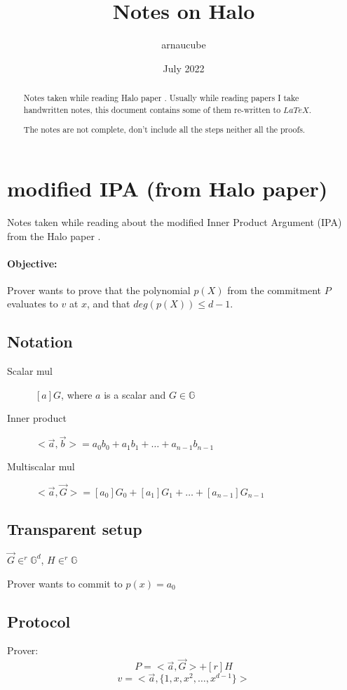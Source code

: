\documentclass{article}
\title{Notes on Halo}
\author{arnaucube}
\date{July 2022}
\theoremstyle{definition}
\begin{document}
\maketitle

\begin{abstract}
	Notes taken while reading Halo paper \cite{cryptoeprint:2019/1021}. Usually while reading papers I take handwritten notes, this document contains some of them re-written to $LaTeX$.

	The notes are not complete, don't include all the steps neither all the proofs.
\end{abstract}

\tableofcontents

\section{modified IPA (from Halo paper)}
Notes taken while reading about the modified Inner Product Argument (IPA) from the Halo paper \cite{cryptoeprint:2019/1021}.

\paragraph{Objective:}
Prover wants to prove that the polynomial $p(X)$ from the commitment $P$ evaluates to $v$ at $x$, and that $deg(p(X)) \leq d-1$.

\subsection{Notation}
\begin{description}
    \item[Scalar mul] $[a]G$, where $a$ is a scalar and $G \in \mathbb{G}$
    \item[Inner product] $<\overrightarrow{a}, \overrightarrow{b}> = a_0 b_0 + a_1 b_1 + \ldots + a_{n-1} b_{n-1}$
    \item[Multiscalar mul] $<\overrightarrow{a}, \overrightarrow{G}> = [a_0] G_0 + [a_1] G_1 + \ldots + [a_{n-1}] G_{n-1}$
\end{description}


\subsection{Transparent setup}
$\overrightarrow{G} \in^r \mathbb{G}^d$, $H \in^r \mathbb{G}$

Prover wants to commit to $p(x)=a_0$
\subsection{Protocol}
Prover:
$$P=<\overrightarrow{a}, \overrightarrow{G}> + [r]H$$
$$v=<\overrightarrow{a}, \{1, x, x^2, \ldots, x^{d-1} \} >$$
\end{document}

